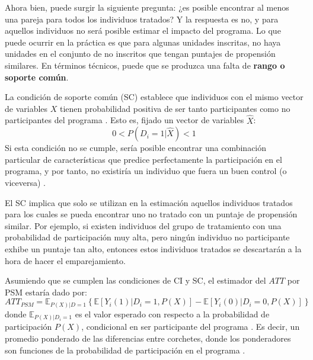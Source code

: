 \documentclass[../../main.tex]{subfiles}
\begin{document}
Ahora bien, puede surgir la siguiente pregunta: ¿es posible encontrar al menos una pareja
para todos los individuos tratados? Y la respuesta es no, y para aquellos individuos no
será posible estimar el impacto del programa. Lo que puede ocurrir en la práctica es que
para algunas unidades inscritas, no haya unidades en el conjunto de no inscritos que
tengan puntajes de propensión similares. En términos técnicos, puede que se produzca una
falta de \textbf{rango o soporte común}.

La condición de soporte común (SC) establece que individuos con el mismo vector de
variables \(X\) tienen probabilidad positiva de ser tanto participantes como no
participantes del programa \cite{bernal}. Esto es, fijado un vector de variables
\(\hat{X}\):
\[0 < P(D_i=1|\hat{X}) < 1\]
Si esta condición no se cumple, sería posible encontrar una
combinación particular de características que predice perfectamente la participación en el
programa, y por tanto, no existiría un individuo que fuera un buen control (o viceversa)
\cite{bernal}.

El SC implica que solo se utilizan en la estimación aquellos individuos tratados para los
cuales se pueda encontrar uno no tratado con un puntaje de propensión similar. Por
ejemplo, si existen individuos del grupo de tratamiento con una probabilidad de
participación muy alta, pero ningún individuo no participante exhibe un puntaje tan alto,
entonces estos individuos tratados se descartarán a la hora de hacer el emparejamiento.

Asumiendo que se cumplen las condiciones de CI y SC, el estimador del \(ATT\) por PSM
estaría dado por:
\[
ATT_{PSM} = \mathbb{E}_{P(X)|D=1}
    \left\{
        \mathbb{E}\left[Y_i(1)|D_i=1, P(X)\right] - \mathbb{E}\left[Y_i(0)|D_i=0, P(X)\right]
    \right\}
\]
donde \(\mathbb{E}_{P(X)|D_i=1}\) es el valor esperado con respecto a la probabilidad de
participación \(P(X)\), condicional en ser participante del programa \cite{bernal}. Es
decir, un promedio ponderado de las diferencias entre corchetes, donde los ponderadores
son funciones de la probabilidad de participación en el programa \cite{bernal}.


\end{document}
